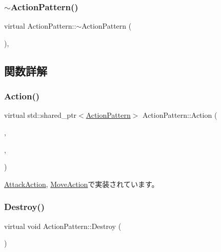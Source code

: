 \subsubsection{\texorpdfstring{$\sim$\+Action\+Pattern()}{~ActionPattern()}}
{\footnotesize\ttfamily virtual Action\+Pattern\+::$\sim$\+Action\+Pattern (\begin{DoxyParamCaption}{ }\end{DoxyParamCaption})\hspace{0.3cm}{\ttfamily [inline]}, {\ttfamily [virtual]}}



\subsection{関数詳解}
\mbox{\label{class_action_pattern_a04c8daf0bf5e263303f7d86aec20eb27}} 
\subsubsection{\texorpdfstring{Action()}{Action()}}
{\footnotesize\ttfamily virtual std\+::shared\+\_\+ptr$<$\mbox{\hyperlink{class_action_pattern}{Action\+Pattern}}$>$ Action\+Pattern\+::\+Action (\begin{DoxyParamCaption}\item[{std\+::shared\+\_\+ptr$<$ \mbox{\hyperlink{class_action_pattern}{Action\+Pattern}} $>$ \&}]{,  }\item[{\mbox{\hyperlink{class_boss}{Boss}} \&}]{,  }\item[{const float}]{ }\end{DoxyParamCaption})\hspace{0.3cm}{\ttfamily [pure virtual]}}



\mbox{\hyperlink{class_attack_action_a3e503ef3d5497f8a49a5273425c79476}{Attack\+Action}}, \mbox{\hyperlink{class_move_action_aa731fa679786c8c61965dfcd258c6c66}{Move\+Action}}で実装されています。

\mbox{\label{class_action_pattern_a73833df08867c4f4785ddf51344eca47}} 
\subsubsection{\texorpdfstring{Destroy()}{Destroy()}}
{\footnotesize\ttfamily virtual void Action\+Pattern\+::\+Destroy (\begin{DoxyParamCaption}{ }\end{DoxyParamCaption})\hspace{0.3cm}{\ttfamily [pure virtual]}}



